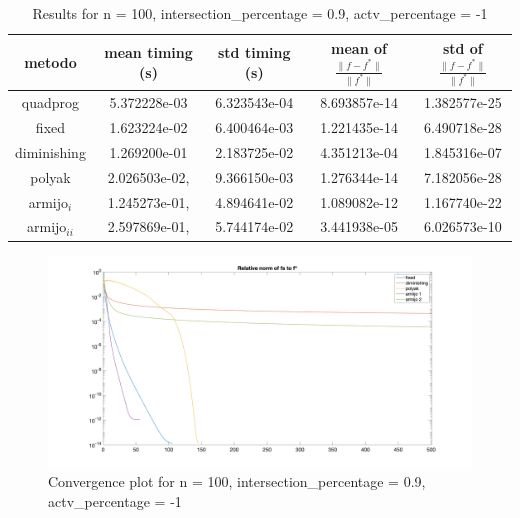 
\begin{table}[H]
\setlength{\tabcolsep}{10pt} %
\renewcommand{\arraystretch}{1.2} %
\centering
\begin{tabular}{|ccccc|} 
\hline 
\multicolumn{1}{|c||}{metodo}   & \multicolumn{1}{c|}{mean timing (s)}    & \multicolumn{1}{c|}{std timing (s)} & \multicolumn{1}{c|}{mean of $\frac{\|f - f^*\|}{\|f^*\|}$}   & std of $\frac{\|f - f^*\|}{\|f^*\|}$ \\ \hline\hline 
\multicolumn{1}{|c||}{quadprog}       & \multicolumn{1}{c|}{5.372228e-03} & \multicolumn{1}{c|}{6.323543e-04}  & \multicolumn{1}{c|}{8.693857e-14} & 1.382577e-25  \\ \hline \hline
\multicolumn{1}{|c||}{fixed}       & \multicolumn{1}{c|}{1.623224e-02} & \multicolumn{1}{c|}{6.400464e-03}  & \multicolumn{1}{c|}{1.221435e-14} & 6.490718e-28  \\ \hline 
\multicolumn{1}{|c||}{diminishing}       & \multicolumn{1}{c|}{1.269200e-01} & \multicolumn{1}{c|}{2.183725e-02}  & \multicolumn{1}{c|}{4.351213e-04} & 1.845316e-07  \\ \hline 
\multicolumn{1}{|c||}{polyak}       & \multicolumn{1}{c|}{2.026503e-02,} & \multicolumn{1}{c|}{9.366150e-03}  & \multicolumn{1}{c|}{1.276344e-14} & 7.182056e-28  \\ \hline 
\multicolumn{1}{|c||}{armijo$_{i}$}       & \multicolumn{1}{c|}{1.245273e-01,} & \multicolumn{1}{c|}{4.894641e-02}  & \multicolumn{1}{c|}{1.089082e-12} & 1.167740e-22  \\ \hline 
\multicolumn{1}{|c||}{armijo$_{ii}$}       & \multicolumn{1}{c|}{2.597869e-01,} & \multicolumn{1}{c|}{5.744174e-02}  & \multicolumn{1}{c|}{3.441938e-05} & 6.026573e-10  \\ \hline 
\end{tabular} 
\caption{Results for n = 100, intersection\_percentage = 0.9, actv\_percentage = -1}
\label{tab:100_menouno_zeronove}
\end{table}


\begin{figure}[H]
\centering
    \includegraphics[width=20cm, center]{./plots/plot_100_menouno_zeronove.png}
    \caption{Convergence plot for n = 100, intersection\_percentage = 0.9, actv\_percentage = -1}
    \label{fig:100_menouno_zeronove}
\end{figure} 


